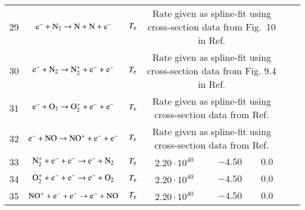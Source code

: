 \documentclass{warpdoc}
\begin{document}
\begin{table}[t]
\begin{center}
\begin{threeparttable}
\begin{tabular}{cccccccc}
29 & $\rm e^{-} +N_2\rightarrow N + N + e^{-}$ &$T_{\rm e}$ & \multicolumn{3}{p{8cm}}{Rate given as spline-fit using cross-section data from Fig.~10 in Ref. \cite{pr:1985;:phelps}}  
                                               & \cite{pr:1985;:phelps} \\
                                               
   30  & $\rm e^- + N_2   \rightarrow N_2^+ + e^- + e^-$   &$T_{\rm e}$
       &  \multicolumn{3}{p{8cm}}{Rate given as spline-fit using cross-section data from Fig. 9.4 in Ref. \cite{aip:1986:itikawa}}
       & \cite{aip:1986:itikawa} \\
       
       
       
    31  & $\rm e^- + O_2   \rightarrow O_2^+ + e^- + e^-$  &$T_{\rm e}$
       &  \multicolumn{3}{p{8cm}}{Rate given as spline-fit using cross-section data from Ref. \cite{pcpp:1992:morgan}}
       & \cite{pcpp:1992:morgan} \\
       
    32  & $\rm e^- + NO  \rightarrow NO^+ + e^- + e^-$  &$T_{\rm e}$
       &  \multicolumn{3}{p{8cm}}{Rate given as spline-fit using cross-section data from Ref. \cite{pcpp:1992:morgan}}
       & \cite{pcpp:1992:morgan} \\
       
33 & $\rm N_2^{+}+e^- + e^-\rightarrow e^- + N_2 $ &$T_{\rm e}$ & $2.20 \cdot 10^{40} $ & $-4.50$ & $0.0$ 
                                               &\cite{nasa:1973:dunn}\\
       
34 & $\rm O_2^{+}+e^- + e^-\rightarrow e^- + O_2 $ &$T_{\rm e}$ & $2.20 \cdot 10^{40} $ & $-4.50$ & $0.0$ 
                                               &\cite{nasa:1973:dunn}\\
                                               
35 & $\rm NO^{+}+e^- + e^-\rightarrow e^- + NO $ &$T_{\rm e}$ & $2.20 \cdot 10^{40} $ & $-4.50$ & $0.0$ 
                                               &\cite{nasa:1973:dunn}\\
                                               

\end{tabular}
\end{threeparttable}
\end{center}
\end{table}
\end{document}
